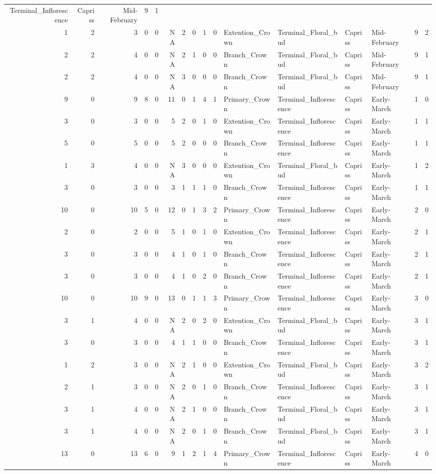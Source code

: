 \documentclass[]{article}
\begin{document}
\begin{longtable}[]{@{}rrrrrrrrrrllllrl@{}}
Terminal\_Inflorescence & Capriss & Mid-February & 9 & 1\tabularnewline
1 & 2 & 3 & 0 & 0 & NA & 2 & 0 & 1 & 0 & Extention\_Crown &
Terminal\_Floral\_bud & Capriss & Mid-February & 9 & 2\tabularnewline
2 & 2 & 4 & 0 & 0 & NA & 2 & 1 & 0 & 0 & Branch\_Crown &
Terminal\_Floral\_bud & Capriss & Mid-February & 9 & 1\tabularnewline
2 & 2 & 4 & 0 & 0 & NA & 3 & 0 & 0 & 0 & Branch\_Crown &
Terminal\_Floral\_bud & Capriss & Mid-February & 9 & 1\tabularnewline
9 & 0 & 9 & 8 & 0 & 11 & 0 & 1 & 4 & 1 & Primary\_Crown &
Terminal\_Inflorescence & Capriss & Early-March & 1 & 0\tabularnewline
3 & 0 & 3 & 0 & 0 & 5 & 2 & 0 & 1 & 0 & Extention\_Crown &
Terminal\_Inflorescence & Capriss & Early-March & 1 & 1\tabularnewline
5 & 0 & 5 & 0 & 0 & 5 & 2 & 0 & 0 & 0 & Branch\_Crown &
Terminal\_Inflorescence & Capriss & Early-March & 1 & 1\tabularnewline
1 & 3 & 4 & 0 & 0 & NA & 3 & 0 & 0 & 0 & Extention\_Crown &
Terminal\_Floral\_bud & Capriss & Early-March & 1 & 2\tabularnewline
3 & 0 & 3 & 0 & 0 & 3 & 1 & 1 & 1 & 0 & Branch\_Crown &
Terminal\_Inflorescence & Capriss & Early-March & 1 & 1\tabularnewline
10 & 0 & 10 & 5 & 0 & 12 & 0 & 1 & 3 & 2 & Primary\_Crown &
Terminal\_Inflorescence & Capriss & Early-March & 2 & 0\tabularnewline
2 & 0 & 2 & 0 & 0 & 5 & 1 & 0 & 1 & 0 & Extention\_Crown &
Terminal\_Inflorescence & Capriss & Early-March & 2 & 1\tabularnewline
3 & 0 & 3 & 0 & 0 & 4 & 1 & 0 & 1 & 0 & Branch\_Crown &
Terminal\_Inflorescence & Capriss & Early-March & 2 & 1\tabularnewline
3 & 0 & 3 & 0 & 0 & 4 & 1 & 0 & 2 & 0 & Branch\_Crown &
Terminal\_Inflorescence & Capriss & Early-March & 2 & 1\tabularnewline
10 & 0 & 10 & 9 & 0 & 13 & 0 & 1 & 1 & 3 & Primary\_Crown &
Terminal\_Inflorescence & Capriss & Early-March & 3 & 0\tabularnewline
3 & 1 & 4 & 0 & 0 & NA & 2 & 0 & 2 & 0 & Extention\_Crown &
Terminal\_Floral\_bud & Capriss & Early-March & 3 & 1\tabularnewline
3 & 0 & 3 & 0 & 0 & 4 & 1 & 1 & 0 & 0 & Branch\_Crown &
Terminal\_Inflorescence & Capriss & Early-March & 3 & 1\tabularnewline
1 & 2 & 3 & 0 & 0 & NA & 2 & 1 & 0 & 0 & Extention\_Crown &
Terminal\_Floral\_bud & Capriss & Early-March & 3 & 2\tabularnewline
2 & 1 & 3 & 0 & 0 & NA & 2 & 0 & 1 & 0 & Branch\_Crown &
Terminal\_Inflorescence & Capriss & Early-March & 3 & 1\tabularnewline
3 & 1 & 4 & 0 & 0 & NA & 2 & 1 & 0 & 0 & Branch\_Crown &
Terminal\_Floral\_bud & Capriss & Early-March & 3 & 1\tabularnewline
3 & 1 & 4 & 0 & 0 & NA & 2 & 0 & 1 & 0 & Branch\_Crown &
Terminal\_Floral\_bud & Capriss & Early-March & 3 & 1\tabularnewline
13 & 0 & 13 & 6 & 0 & 9 & 1 & 2 & 1 & 4 & Primary\_Crown &
Terminal\_Inflorescence & Capriss & Early-March & 4 & 0\tabularnewline

\end{longtable}
\end{document}
